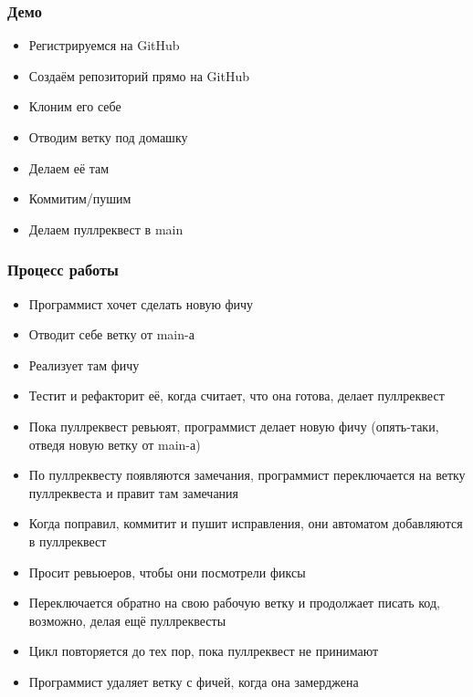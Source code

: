 \documentclass[xetex,mathserif,serif]{beamer}
\begin{document}
    \begin{frame}
        \frametitle{Демо}
        \begin{itemize}
            \item Регистрируемся на GitHub
            \item Создаём репозиторий прямо на GitHub
            \item Клоним его себе
            \item Отводим ветку под домашку
            \item Делаем её там
            \item Коммитим/пушим
            \item Делаем пуллреквест в main
        \end{itemize}
    \end{frame}

    \begin{frame}
        \frametitle{Процесс работы}
        \begin{footnotesize}
            \begin{itemize}
                \item Программист хочет сделать новую фичу
                \item Отводит себе ветку от main-а
                \item Реализует там фичу
                \item Тестит и рефакторит её, когда считает, что она готова, делает пуллреквест
                \item Пока пуллреквест ревьюят, программист делает новую фичу (опять-таки, отведя новую ветку от main-а)
                \item По пуллреквесту появляются замечания, программист переключается на ветку пуллреквеста и правит там замечания
                \item Когда поправил, коммитит и пушит исправления, они автоматом добавляются в пуллреквест
                \item Просит ревьюеров, чтобы они посмотрели фиксы
                \item Переключается обратно на свою рабочую ветку и продолжает писать код, возможно, делая ещё пуллреквесты 
                \item Цикл повторяется до тех пор, пока пуллреквест не принимают
                \item Программист удаляет ветку с фичей, когда она замерджена
            \end{itemize}
        \end{footnotesize}
    \end{frame}
\end{document}
